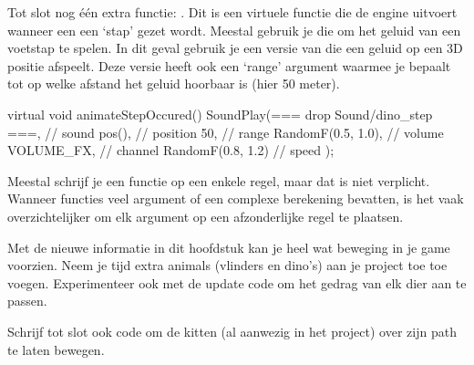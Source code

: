 Tot slot nog \'e\'en extra functie: . Dit is een virtuele functie die de engine uitvoert wanneer een een `stap' gezet wordt. Meestal gebruik je die om het geluid van een voetstap te spelen. In dit geval gebruik je een versie van  die een geluid op een 3D positie afspeelt. Deze versie heeft ook een `range' argument waarmee je bepaalt tot op welke afstand het geluid hoorbaar is (hier 50 meter).

\begin{code}
virtual void animateStepOccured()
{
  SoundPlay(=== drop Sound/dino_step ===, 	// sound
  			pos(), 							// position
  			50, 							// range
  			RandomF(0.5, 1.0), 				// volume
  			VOLUME_FX, 						// channel
  			RandomF(0.8, 1.2)				// speed
  );
}
\end{code}

\begin{note}
Meestal schrijf je een functie op een enkele regel, maar dat is niet verplicht. Wanneer functies veel argument of een complexe berekening bevatten, is het vaak overzichtelijker om elk argument op een afzonderlijke regel te plaatsen.
\end{note}

\begin{exercise}
Met de nieuwe informatie in dit hoofdstuk kan je heel wat beweging in je game voorzien. Neem je tijd extra animals (vlinders en dino's) aan je project toe toe voegen. Experimenteer ook met de update code om het gedrag van elk dier aan te passen. 

Schrijf tot slot ook code om de kitten (al aanwezig in het project) over zijn path te laten bewegen.
\end{exercise}